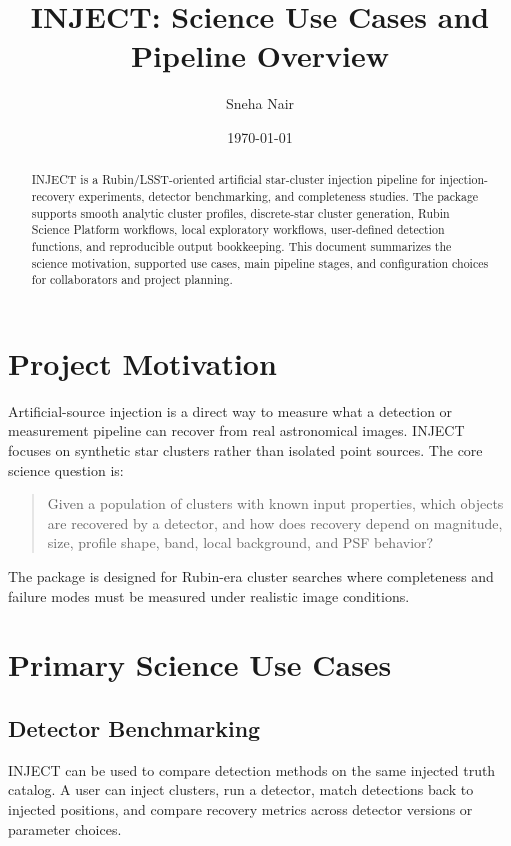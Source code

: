 \documentclass[11pt]{article}
\title{INJECT: Science Use Cases and Pipeline Overview}
\author{Sneha Nair}
\date{\today}
\begin{document}
\maketitle

\begin{abstract}
INJECT is a Rubin/LSST-oriented artificial star-cluster injection pipeline for injection-recovery experiments, detector benchmarking, and completeness studies. The package supports smooth analytic cluster profiles, discrete-star cluster generation, Rubin Science Platform workflows, local exploratory workflows, user-defined detection functions, and reproducible output bookkeeping. This document summarizes the science motivation, supported use cases, main pipeline stages, and configuration choices for collaborators and project planning.
\end{abstract}

\section{Project Motivation}

Artificial-source injection is a direct way to measure what a detection or measurement pipeline can recover from real astronomical images. INJECT focuses on synthetic star clusters rather than isolated point sources. The core science question is:

\begin{quote}
Given a population of clusters with known input properties, which objects are recovered by a detector, and how does recovery depend on magnitude, size, profile shape, band, local background, and PSF behavior?
\end{quote}

The package is designed for Rubin-era cluster searches where completeness and failure modes must be measured under realistic image conditions.

\section{Primary Science Use Cases}

\subsection{Detector Benchmarking}

INJECT can be used to compare detection methods on the same injected truth catalog. A user can inject clusters, run a detector, match detections back to injected positions, and compare recovery metrics across detector versions or parameter choices.
\end{document}
